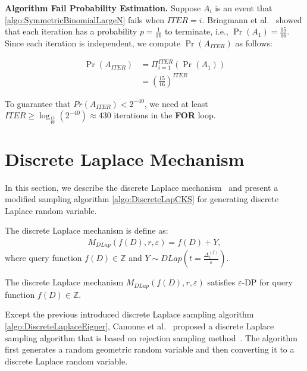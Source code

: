 \textbf{Algorithm Fail Probability Estimation. }
Suppose $A_i$ is an event that \autoref{algo:SymmetricBinomialLargeN} fails when $ITER=i$.
Bringmann et al.~\cite{bringmann2014internal} showed that each iteration has a probability $p=\frac{1}{16} $ to terminate, i.e., $\Pr\left(A_1\right)=\frac{15}{16} $.
Since each iteration is independent, we compute $\Pr\left(A_{ITER}\right)$ as follows:

\begin{equation}
    \begin{split}
        \Pr\left(A_{ITER}\right) &  =  \Pi _{i=1}^{ITER}\left(\Pr\left(A_1\right) \right) \\
        &=\left(\frac{15}{16}\right)^{ITER}
    \end{split}
\end{equation}

To guarantee that $Pr\left(A_{ITER}\right)<2^{-40}$, we need at least $ITER\geq \log _\frac{15}{16}\left(2^{-40}\right)\approx 430$ iterations in the \textbf{FOR} loop.

\section{Discrete Laplace Mechanism}
\label{sec:discreteLaplacemechanism}

In this section, we describe the discrete Laplace mechanism~\cite{chan2012privacy, ghosh2012universally,eigner2014differentially} and present a modified sampling algorithm \autoref{algo:DiscreteLapCKS} for generating discrete Laplace random variable.

The discrete Laplace mechanism is define as:
\begin{equation}
    \begin{split}
        M_{DLap}\left(f\left(D\right),r,\varepsilon\right)=f\left(D\right) +Y,
    \end{split}
\end{equation}
where query function $f\left(D\right)\in\mathbb{Z} $ and $Y\sim DLap\left(t=\frac{\Delta_1^{\left(f\right) }}{\varepsilon}\right) $.

\begin{theorem}
    The discrete Laplace mechanism $M_{DLap}\left(f\left(D\right),r,\varepsilon\right)$ satisfies $\varepsilon$-DP for query function $f\left(D\right)\in\mathbb{Z} $.
\end{theorem}

Except the previous introduced discrete Laplace sampling algorithm \autoref{algo:DiscreteLaplaceEigner}, Canonne et al.~\cite{canonne2020discrete} proposed a discrete Laplace sampling algorithm that is based on rejection sampling method~\cite{casella2004generalized}. The algorithm first generates a random geometric random variable and then converting it to a discrete Laplace random variable.


